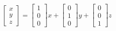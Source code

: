 \documentclass[preview]{standalone}
\begin{document}
$$\begin{bmatrix}x\\y\\z\end{bmatrix} = \begin{bmatrix}1\\0\\0\end{bmatrix} x + \begin{bmatrix}0\\1\\0\end{bmatrix} y + \begin{bmatrix}0\\0\\1\end{bmatrix} z$$
\end{document}
